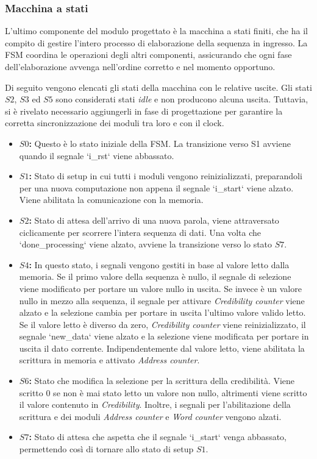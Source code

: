 \subsubsection{Macchina a stati}
  \par L'ultimo componente del modulo progettato è la macchina a stati finiti, che ha il compito di gestire l'intero processo di elaborazione della sequenza in ingresso. 
    La FSM coordina le operazioni degli altri componenti, assicurando che ogni fase dell'elaborazione avvenga nell'ordine corretto e nel momento opportuno.
  \par Di seguito vengono elencati gli stati della macchina con le relative uscite. 
    Gli stati $S2$, $S3$ ed $S5$ sono considerati stati \textit{idle} e non producono alcuna uscita. 
    Tuttavia, si è rivelato necessario aggiungerli in fase di progettazione per garantire la corretta sincronizzazione dei moduli tra loro e con il clock.
  \begin{itemize}
    \item \textbf{$S0$:} Questo è lo stato iniziale della FSM. 
      La transizione verso S1 avviene quando il segnale `i\_rst` viene abbassato.
    \item \textbf{$S1$:} Stato di setup in cui tutti i moduli vengono reinizializzati, preparandoli per una nuova computazione non appena il segnale `i\_start` viene alzato. 
      Viene abilitata la comunicazione con la memoria.
    \item \textbf{$S2$:} Stato di attesa dell'arrivo di una nuova parola, viene attraversato ciclicamente per scorrere l'intera sequenza di dati. 
      Una volta che `done\_processing` viene alzato, avviene la transizione verso lo stato $S7$.
    \item \textbf{$S4$:} In questo stato, i segnali vengono gestiti in base al valore letto dalla memoria. 
      Se il primo valore della sequenza è nullo, il segnale di selezione viene modificato per portare un valore nullo in uscita. 
      Se invece è un valore nullo in mezzo alla sequenza, il segnale per attivare \textit{Credibility counter} viene alzato e la selezione cambia per portare in uscita l'ultimo valore valido letto. 
      Se il valore letto è diverso da zero, \textit{Credibility counter} viene reinizializzato, il segnale `new\_data` viene alzato e la selezione viene modificata per portare in uscita il dato corrente. 
      Indipendentemente dal valore letto, viene abilitata la scrittura in memoria e attivato \textit{Address counter}.
    \item \textbf{$S6$:} Stato che modifica la selezione per la scrittura della credibilità. 
      Viene scritto 0 se non è mai stato letto un valore non nullo, altrimenti viene scritto il valore contenuto in \textit{Credibility}. 
      Inoltre, i segnali per l'abilitazione della scrittura e dei moduli \textit{Address counter} e \textit{Word counter} vengono alzati.
    \item \textbf{$S7$:} Stato di attesa che aspetta che il segnale `i\_start` venga abbassato, permettendo così di tornare allo stato di setup $S1$.
  \end{itemize}

